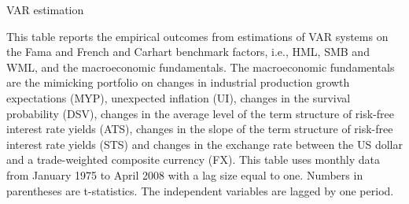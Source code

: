\documentclass[12pt,a4paper]{ouparticle}
\begin{document}
%     

\begin{table}
\centering
  \begin{threeparttable}
    \caption{VAR estimation}
    
    \begin{tablenotes} 
    \small 
    \item This table reports the empirical outcomes from estimations of VAR systems on the Fama and French and Carhart benchmark factors, i.e., HML, SMB and WML, and the macroeconomic fundamentals. The macroeconomic fundamentals are the mimicking portfolio on changes in industrial production growth expectations (MYP), unexpected inflation (UI), changes in the survival probability (DSV), changes in the average level of the term structure of risk-free interest rate yields (ATS), changes in the slope of the term structure of risk-free interest rate yields (STS) and changes in the exchange rate between the US dollar and a trade-weighted composite currency (FX). This table uses monthly data from January 1975 to April 2008 with a lag size equal to one. Numbers in parentheses are t-statistics.
    The independent variables are lagged by one period.
    \end{tablenotes}
  \end{threeparttable}
\end{table}
\end{document}
